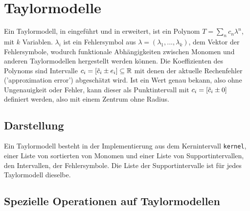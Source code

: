 \chapter{Taylormodelle}

Ein Taylormodell, in \cite{makino2001} eingeführt und in \cite{DBLP:conf/macis/BrausseKM15} erweitert, ist ein Polynom $T = \sum_n c_n \lambda^n$, mit $k$ Variablen. $\lambda_i$ ist ein Fehlersymbol aus $\lambda = (\lambda_1, ... , \lambda_k)$, dem Vektor der Fehlersymbole, wodurch funktionale Abhängigkeiten zwischen Monomen und anderen Taylormodellen hergestellt werden können. Die Koeffizienten des Polynoms sind Intervalle $c_i = [\Tilde{c}_i \pm e_i] \subseteq \mathbb{R}$ mit denen der aktuelle Rechenfehler ('approximation error') abgeschätzt wird. Ist ein Wert genau bekann, also ohne Ungenauigkeit oder Fehler, kann dieser als Punktintervall mit $c_i = [\Tilde{c}_i \pm 0]$ definiert werden, also mit einem Zentrum ohne Radius.


\section{Darstellung}
Ein Taylormodell besteht in der Implementierung aus dem Kernintervall \verb+kernel+, einer Liste von sortierten von Monomen und einer Liste von Supportintervallen, den Intervallen, der Fehlersymbole. Die Liste der Supportintervalle ist für jedes Taylormodell dieselbe.


\section{Spezielle Operationen auf Taylormodellen}
